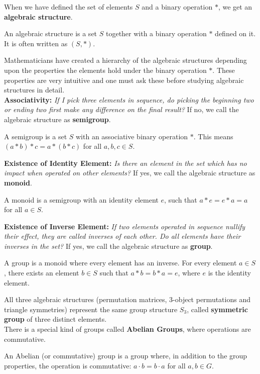 When we have defined the set of elements $S$ and a binary operation $*$, we get an \textbf{algebraic structure}. 

\begin{definition}
    An algebraic structure is a set $S$ together with a binary operation $*$ defined on it. It is often written as $(S, *)$.
\end{definition}

Mathematicians have created a hierarchy of the algebraic structures depending upon the properties the elements hold under the binary operation $*$. These properties are very intuitive and one must ask these before studying algebraic structures in detail. \\

\textbf{Associativity:} \textit{If I pick three elements in sequence, do picking the beginning two or ending two first make any difference on the final result?} If no, we call the algebraic structure as \textbf{semigroup}. \\

\begin{definition}
    A semigroup is a set \( S \) with an associative binary operation \( * \). This means \( (a * b) * c = a * (b * c) \) for all \( a, b, c \in S \).
\end{definition}

\textbf{Existence of Identity Element:} \textit{Is there an element in the set which has no impact when operated on other elements?} If yes, we call the algebraic structure as \textbf{monoid}.

\begin{definition}
    A monoid is a semigroup with an identity element \( e \), such that \( a * e = e * a = a \) for all \( a \in S \).
\end{definition}

\textbf{Existence of Inverse Element:} \textit{If two elements operated in sequence nullify their effect, they are called inverses of each other. Do all elements have their inverses in the set?} If yes, we call the algebraic structure as \textbf{group}.

\begin{definition}
    A group is a monoid where every element has an inverse. For every element \( a \in S \), there exists an element \( b \in S \) such that \( a * b = b * a = e \), where \( e \) is the identity element.
\end{definition}

All three algebraic structures (permutation matrices, 3-object permutations and triangle symmetries) represent the same group structure $S_3$, called \textbf{symmetric group} of three distinct elements. \\

There is a special kind of groups called \textbf{Abelian Groups}, where operations are commutative. 

\begin{definition}
    An Abelian (or commutative) group is a group where, in addition to the group properties, the operation is commutative: \( a \cdot b = b \cdot a \) for all \( a, b \in G \).
\end{definition}


